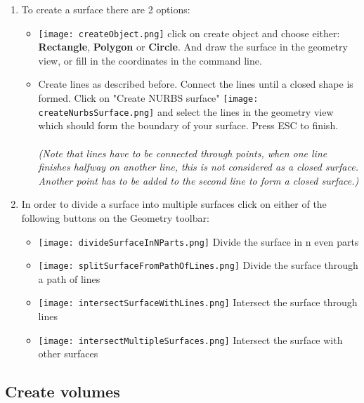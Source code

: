 \begin{enumerate}
	\setlength\itemsep{2mm}
	
	\item To create a surface there are 2 options:
	\begin{itemize}
		\setlength\itemsep{2mm}
		\item \texttt{[image: createObject.png]}   click on create object and choose either: \textbf{Rectangle}, \textbf{Polygon} or \textbf{Circle}. And draw the surface in the geometry view, or fill in the coordinates in the command line.
		
		\item   Create lines as described before. Connect the lines until a closed shape is formed. Click on "Create NURBS surface" \texttt{[image: createNurbsSurface.png]} and select the lines in the geometry view which should form the boundary of your surface. Press ESC to finish. \\\\
		\textit{	(Note that lines have to be connected through points, when one line  finishes halfway on another line, this is not considered as a closed surface. Another point has to be added to the second line to form a closed surface.) }
	\end{itemize}

	\item In order to divide a surface into multiple surfaces click on either of the following buttons on the Geometry toolbar:
		\begin{itemize}
		\setlength\itemsep{2mm}
		\item \texttt{[image: divideSurfaceInNParts.png]}  Divide the surface in n even parts
		\item \texttt{[image: splitSurfaceFromPathOfLines.png]} Divide the surface through a path of lines
		
		\item \texttt{[image: intersectSurfaceWithLines.png]} Intersect the surface through lines
		
		\item \texttt{[image: intersectMultipleSurfaces.png]} Intersect the surface with other surfaces
		
	\end{itemize}

\end{enumerate}

\subsection{Create volumes}

